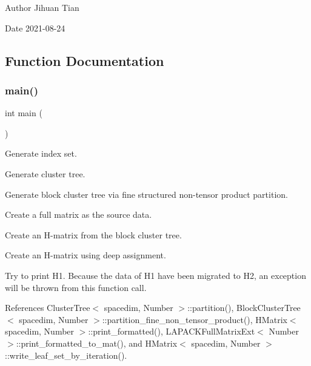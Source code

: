 \begin{DoxyAuthor}{Author}
Jihuan Tian 
\end{DoxyAuthor}
\begin{DoxyDate}{Date}
2021-\/08-\/24 
\end{DoxyDate}


\subsection{Function Documentation}
\mbox{\label{hmatrix-overloaded-deep-assignment_8cc_ae66f6b31b5ad750f1fe042a706a4e3d4}} 
\subsubsection{\texorpdfstring{main()}{main()}}
{\footnotesize\ttfamily int main (\begin{DoxyParamCaption}{ }\end{DoxyParamCaption})}

Generate index set.

Generate cluster tree.

Generate block cluster tree via fine structured non-\/tensor product partition.

Create a full matrix as the source data.

Create an H-\/matrix from the block cluster tree.

Create an H-\/matrix using deep assignment.

Try to print H1. Because the data of H1 have been migrated to H2, an exception will be thrown from this function call.

References Cluster\+Tree$<$ spacedim, Number $>$\+::partition(), Block\+Cluster\+Tree$<$ spacedim, Number $>$\+::partition\+\_\+fine\+\_\+non\+\_\+tensor\+\_\+product(), H\+Matrix$<$ spacedim, Number $>$\+::print\+\_\+formatted(), L\+A\+P\+A\+C\+K\+Full\+Matrix\+Ext$<$ Number $>$\+::print\+\_\+formatted\+\_\+to\+\_\+mat(), and H\+Matrix$<$ spacedim, Number $>$\+::write\+\_\+leaf\+\_\+set\+\_\+by\+\_\+iteration().

